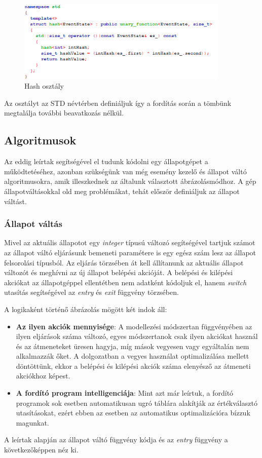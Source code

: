 \documentclass[a4paper,12pt]{report}
\begin{document}
\begin{figure}[hbtp]
\centering
\includegraphics[width=0.9\textwidth]{hashc.png}
\caption{Hash osztály}
\label{fig:hod}
\end{figure}

Az osztályt az STD névtérben definiáljuk így a fordítás során a tömbünk megtalálja további beavatkozás nélkül.

\subsection{Algoritmusok}

Az eddig leírtak segítségével el tudunk kódolni egy állapotgépet a működtetéséhez, azonban szükségünk van még esemény kezelő és állapot váltó algoritmusokra, amik illeszkednek az általunk választott ábrázolásmódhoz. A gép állapotváltásokkal old meg problémákat, tehát először definiáljuk az állapot váltást.

\subsubsection{Állapot váltás}
Mivel az aktuális állapotot egy {\it integer} típusú változó segítségével tartjuk számot az állapot váltó eljárásunk bemeneti paramétere is egy egész szám lesz az állapot felsorolási típusból. Az eljárás törzsében át kell állítanunk az aktuális állapot változót és meghívni az új állapot belépési akcióját. A belépési és kilépési akciókat az állapotgéppel ellentétben nem adatként kódoljuk el, hanem {\it switch} utasítás segítségével az {\it entry} és {\it exit} függvény törzsében.

A logikaként történő ábrázolás mögött két indok áll:
\begin{itemize}
\item {\bf Az ilyen akciók mennyisége}: A modellezési módszertan függvényében az ilyen eljárások száma változó, egyes módszertanok %
csak ilyen akciókat használ és az átmeneteket üresen hagyja, míg mások vegyesen vagy egyáltalán nem alkalmazzák őket.
A dolgozatban a vegyes használat optimalizálása mellett döntöttünk, ekkor a belépési és kilépési akciók száma elenyésző az átmeneti akciókhoz képest.
\item {\bf A fordító program intelligenciája}: Mint azt már leírtuk, a fordító programok sok esetben automatikusan ugró táblára alakítják az értékválasztó utasításokat, ezért ebben az esetben az automatikus optimalizációra bízzuk magunkat.
\end{itemize}
A leírtak alapján az állapot váltó függvény kódja és az {\it entry} függvény a következőképpen néz ki.
\end{document}
